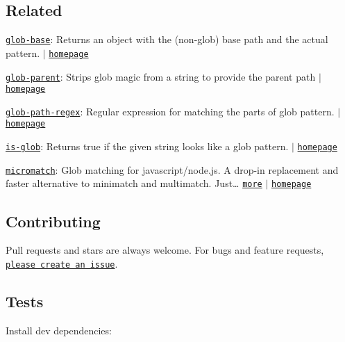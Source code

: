 \subsection*{Related}


\begin{DoxyItemize}
\item \href{https://www.npmjs.com/package/glob-base}{\tt glob-\/base}\+: Returns an object with the (non-\/glob) base path and the actual pattern. $\vert$ \href{https://github.com/jonschlinkert/glob-base}{\tt homepage}
\item \href{https://www.npmjs.com/package/glob-parent}{\tt glob-\/parent}\+: Strips glob magic from a string to provide the parent path $\vert$ \href{https://github.com/es128/glob-parent}{\tt homepage}
\item \href{https://www.npmjs.com/package/glob-path-regex}{\tt glob-\/path-\/regex}\+: Regular expression for matching the parts of glob pattern. $\vert$ \href{https://github.com/regexps/glob-path-regex}{\tt homepage}
\item \href{https://www.npmjs.com/package/is-glob}{\tt is-\/glob}\+: Returns {\ttfamily true} if the given string looks like a glob pattern. $\vert$ \href{https://github.com/jonschlinkert/is-glob}{\tt homepage}
\item \href{https://www.npmjs.com/package/micromatch}{\tt micromatch}\+: Glob matching for javascript/node.\+js. A drop-\/in replacement and faster alternative to minimatch and multimatch. Just… \href{https://www.npmjs.com/package/micromatch}{\tt more} $\vert$ \href{https://github.com/jonschlinkert/micromatch}{\tt homepage}
\end{DoxyItemize}

\subsection*{Contributing}

Pull requests and stars are always welcome. For bugs and feature requests, \href{https://github.com/jonschlinkert/parse-glob/issues/new}{\tt please create an issue}.

\subsection*{Tests}

Install dev dependencies\+:




